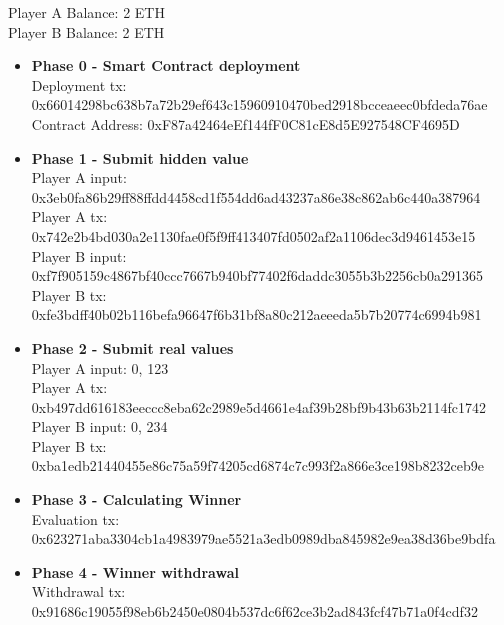 \documentclass[12pt,a4paper]{article}
\begin{document}
Player A Balance: 2 ETH \\
Player B Balance: 2 ETH \\

\begin{itemize}
    \item \textbf{Phase 0 - Smart Contract deployment} \\
    
    Deployment tx: 0x66014298bc638b7a72b29ef643c15960910470bed2918bcceaeec0bfdeda76ae \\
    Contract Address: 0xF87a42464eEf144fF0C81cE8d5E927548CF4695D \\

    \item \textbf{Phase 1 - Submit hidden value} \\
    
    Player A input: 0x3eb0fa86b29ff88ffdd4458cd1f554dd6ad43237a86e38c862ab6c440a387964 \\
    Player A tx: 0x742e2b4bd030a2e1130fae0f5f9ff413407fd0502af2a1106dec3d9461453e15 \\

    Player B input: 0xf7f905159c4867bf40ccc7667b940bf77402f6daddc3055b3b2256cb0a291365 \\
    Player B tx: 0xfe3bdff40b02b116befa96647f6b31bf8a80c212aeeeda5b7b20774c6994b981 \\

    \item \textbf{Phase 2 - Submit real values} \\

    Player A input: 0, 123 \\
    Player A tx: 0xb497dd616183eeccc8eba62c2989e5d4661e4af39b28bf9b43b63b2114fc1742 \\

    Player B input: 0, 234 \\
    Player B tx: 0xba1edb21440455e86c75a59f74205cd6874c7c993f2a866e3ce198b8232ceb9e \\

    \item \textbf{Phase 3 - Calculating Winner} \\
    
    Evaluation tx: 0x623271aba3304cb1a4983979ae5521a3edb0989dba845982e9ea38d36be9bdfa\\

    \item \textbf{Phase 4 - Winner withdrawal} \\
    
    Withdrawal tx: 0x91686c19055f98eb6b2450e0804b537dc6f62ce3b2ad843fcf47b71a0f4cdf32 \\
\end{itemize}
\end{document}

